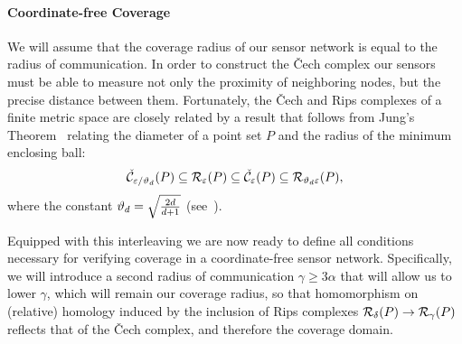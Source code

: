 \paragraph{Coordinate-free Coverage}
We will assume that the coverage radius of our sensor network is equal to the radius of communication.
In order to construct the \v Cech complex our sensors must be able to measure not only the proximity of neighboring nodes, but the precise distance between them.
Fortunately, the \v Cech and Rips complexes of a finite metric space are closely related by a result that follows from Jung's Theorem~\cite{jung01uber} relating the diameter of a point set $P$ and the radius of the minimum enclosing ball:
\[\check{\mathcal{C}}_{\varepsilon/\vartheta_d}(P)\subseteq\mathcal{R}_\varepsilon(P)\subseteq\check{\mathcal{C}}_\varepsilon(P)\subseteq\mathcal{R}_{\vartheta_d\varepsilon}(P),\]
where the constant $\vartheta_d = \sqrt{\frac{2d}{d+1}}$ (see~\cite{buchet15efficient}).

Equipped with this interleaving we are now ready to define all conditions necessary for verifying coverage in a coordinate-free sensor network.
Specifically, we will introduce a second radius of communication $\gamma\geq 3\alpha$ that will allow us to lower $\gamma$, which will remain our coverage radius, so that homomorphism on (relative) homology induced by the inclusion of Rips complexes $\mathcal{R}_\delta(P)\to\mathcal{R}_\gamma(P)$ reflects that of the \v Cech complex, and therefore the coverage domain.

%
%


